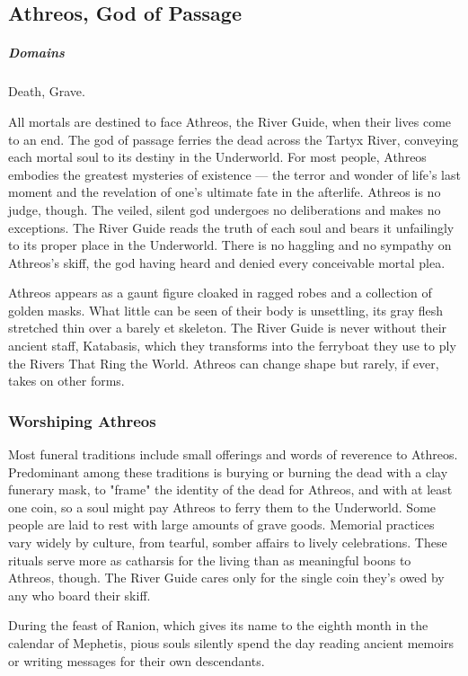 \subsection*{Athreos, God of Passage} \label{ssec::athreos}
    \subparagraph{Domains} Death, Grave.

    All mortals are destined to face Athreos, the River Guide, when their lives come to an end.
    The god of passage ferries the dead across the Tartyx River, conveying each mortal soul to its destiny in the Underworld.
    For most people, Athreos embodies the greatest mysteries of existence --- the terror and wonder of life's last moment and the revelation of one's ultimate fate in the afterlife.
    Athreos is no judge, though.
    The veiled, silent god undergoes no deliberations and makes no exceptions.
    The River Guide reads the truth of each soul and bears it unfailingly to its proper place in the Underworld.
    There is no haggling and no sympathy on Athreos's skiff, the god having heard and denied every conceivable mortal plea.

    Athreos appears as a gaunt figure cloaked in ragged robes and a collection of golden masks.
    What little can be seen of their body is unsettling, its gray flesh stretched thin over a barely et skeleton.
    The River Guide is never without their ancient staff, Katabasis, which they transforms into the ferryboat they use to ply the Rivers That Ring the World.
    Athreos can change shape but rarely, if ever, takes on other forms.

    \subsubsection{Worshiping Athreos}
        Most funeral traditions include small offerings and words of reverence to Athreos.
        Predominant among these traditions is burying or burning the dead with a clay funerary mask, to "frame" the identity of the dead for Athreos, and with at least one coin, so a soul might pay Athreos to ferry them to the Underworld.
        Some people are laid to rest with large amounts of grave goods.
        Memorial practices vary widely by culture, from tearful, somber affairs to lively celebrations.
        These rituals serve more as catharsis for the living than as meaningful boons to Athreos, though.
        The River Guide cares only for the single coin they's owed by any who board their skiff.

        During the feast of Ranion, which gives its name to the eighth month in the calendar of Mephetis, pious souls silently spend the day reading ancient memoirs or writing messages for their own descendants.

